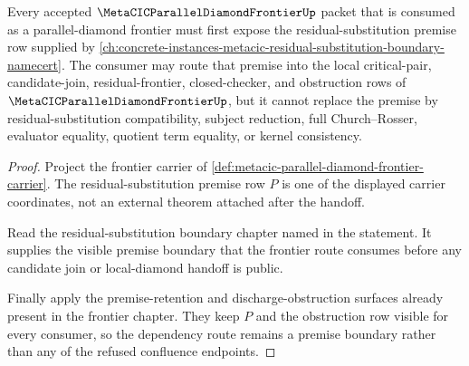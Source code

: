 \begin{theorem}
\label{thm:metacic-parallel-diamond-frontier-residual-substitution-dependency-route}
Every accepted $\MetaCICParallelDiamondFrontierUp$ packet that is consumed as a parallel-diamond frontier must first expose the residual-substitution premise row supplied by \autoref{ch:concrete-instances-metacic-residual-substitution-boundary-namecert}. The consumer may route that premise into the local critical-pair, candidate-join, residual-frontier, closed-checker, and obstruction rows of $\MetaCICParallelDiamondFrontierUp$, but it cannot replace the premise by residual-substitution compatibility, subject reduction, full Church--Rosser, evaluator equality, quotient term equality, or kernel consistency.
\end{theorem}
\begin{proof}
Project the frontier carrier of \autoref{def:metacic-parallel-diamond-frontier-carrier}. The residual-substitution premise row $P$ is one of the displayed carrier coordinates, not an external theorem attached after the handoff.

Read the residual-substitution boundary chapter named in the statement. It supplies the visible premise boundary that the frontier route consumes before any candidate join or local-diamond handoff is public.

Finally apply the premise-retention and discharge-obstruction surfaces already present in the frontier chapter. They keep $P$ and the obstruction row visible for every consumer, so the dependency route remains a premise boundary rather than any of the refused confluence endpoints.
\end{proof}

